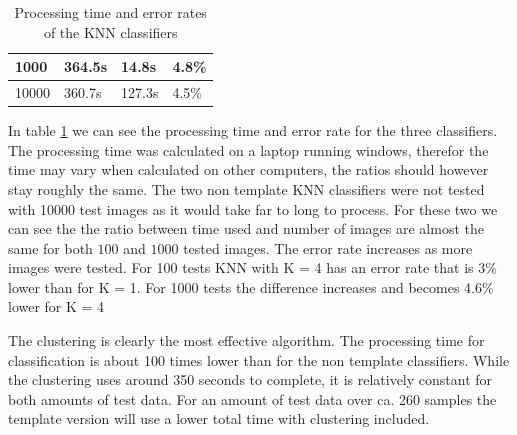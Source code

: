 \documentclass{article}
\begin{document}
\begin{table}[]
\begin{tabular}{lllll}
\multicolumn{1}{|l|}{1000}                               & \multicolumn{2}{l|}{364.5s}                                      & \multicolumn{1}{l|}{14.8s}     & \multicolumn{1}{l|}{4.8\%}      \\ \hline
\multicolumn{1}{|l|}{10000}                              & \multicolumn{2}{l|}{360.7s}                                      & \multicolumn{1}{l|}{127.3s}    & \multicolumn{1}{l|}{4.5\%}      \\ \hline
\end{tabular}
\caption{Processing time and error rates of the KNN classifiers}
\label{tbl:time}
\end{table}

In table \ref{tbl:time} we can see the processing time and error rate for the three classifiers. The processing time was calculated on a laptop running windows, therefor the time may vary when calculated on other computers, the ratios should however stay roughly the same. The two non template KNN classifiers were not tested with 10000 test images as it would take far to long to process. For these two we can see the the ratio between time used and number of images are almost the same for both $100$ and $1000$ tested images. The error rate increases as more images were tested. For 100 tests KNN with K = 4 has an error rate that is $3\%$ lower than for K = 1. For 1000 tests the difference increases and becomes 4.6\% lower for K = 4

The clustering is clearly the most effective algorithm. The processing time for classification is about 100 times lower than for the non template classifiers. While the clustering uses around 350 seconds to complete, it is relatively constant for both amounts of test data. For an amount of test data over ca. 260 samples the template version will use a lower total time with clustering included. 
\end{document}
